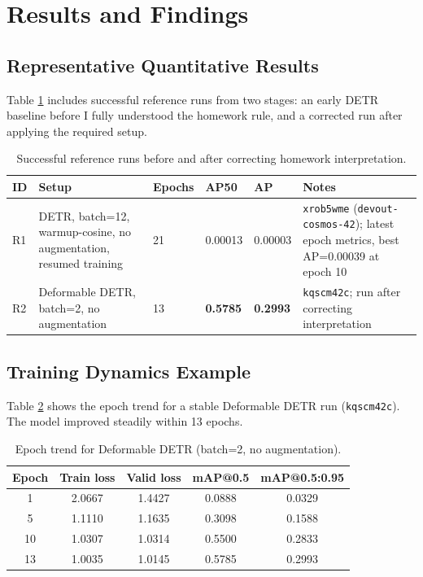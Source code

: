 \section{Results and Findings}
\subsection{Representative Quantitative Results}
Table \ref{tab:main_results} includes successful reference runs from two stages:
an early DETR baseline before I fully understood the homework rule, and a corrected run after applying the required setup.

\begin{table}[H]
    \centering
    \scriptsize
    \caption{Successful reference runs before and after correcting homework interpretation.}
    \label{tab:main_results}
    \begin{tabular}{p{1.0cm}p{5.5cm}p{1.1cm}p{1.2cm}p{1.6cm}p{4.0cm}}
        \toprule
        ID & Setup & Epochs & AP50 & AP & Notes \\
        \midrule
        R1 & DETR, batch=12, warmup-cosine, no augmentation, resumed training & 21 & 0.00013 & 0.00003 & \texttt{xrob5wme} (\texttt{devout-cosmos-42}); latest epoch metrics, best AP=0.00039 at epoch 10 \\
        R2 & Deformable DETR, batch=2, no augmentation & 13 & \textbf{0.5785} & \textbf{0.2993} & \texttt{kqscm42c}; run after correcting interpretation \\
        \bottomrule
    \end{tabular}
\end{table}

\subsection{Training Dynamics Example}
Table \ref{tab:deformable_curve} shows the epoch trend for a stable Deformable DETR run (\texttt{kqscm42c}).
The model improved steadily within 13 epochs.

\begin{table}[H]
    \centering
    \caption{Epoch trend for Deformable DETR (batch=2, no augmentation).}
    \label{tab:deformable_curve}
    \begin{tabular}{ccccc}
        \toprule
        Epoch & Train loss & Valid loss & mAP@0.5 & mAP@0.5:0.95 \\
        \midrule
        1 & 2.0667 & 1.4427 & 0.0888 & 0.0329 \\
        5 & 1.1110 & 1.1635 & 0.3098 & 0.1588 \\
        10 & 1.0307 & 1.0314 & 0.5500 & 0.2833 \\
        13 & 1.0035 & 1.0145 & 0.5785 & 0.2993 \\
        \bottomrule
    \end{tabular}
\end{table}

